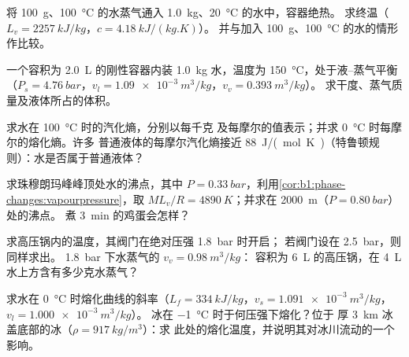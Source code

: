 \begin{exercise}[$\star$]\label{exo:b1:phase-changes:2}
将 \qty{100}{g}、\qty{100}{\degreeCelsius} 的水蒸气通入
\qty{1.0}{kg}、\qty{20}{\degreeCelsius} 的水中，容器绝热。
求终温（$L_v = \qty{2257}{kJ/kg}$，$c = \qty{4.18}{kJ/(kg.K)}$）。
并与加入 \qty{100}{g}、\qty{100}{\degreeCelsius} 的水的情形作比较。
\end{exercise}

\begin{exercise}[$\star$]\label{exo:b1:phase-changes:3}
一个容积为 \qty{2.0}{L} 的刚性容器内装 \qty{1.0}{kg} 水，温度为
\qty{150}{\degreeCelsius}，处于液–蒸气平衡（$P_s =
\qty{4.76}{bar}$，$v_l = \qty{1.09e-3}{m^3/kg}$，$v_v = \qty{0.393}{m^3/kg}$）。
求干度、蒸气质量及液体所占的体积。
\end{exercise}

\begin{exercise}[$\star$]\label{exo:b1:phase-changes:4}
求水在 \qty{100}{\degreeCelsius} 时的汽化熵，分别以每千克
及每摩尔的值表示；并求 \qty{0}{\degreeCelsius} 时每摩尔的熔化熵。许多
普通液体的每摩尔汽化熵接近
\qty{88}{J/(mol.K)}（特鲁顿规则）：水是否属于普通液体？
\end{exercise}

\begin{exercise}[$\star\star$]\label{exo:b1:phase-changes:5}
求珠穆朗玛峰峰顶处水的沸点，其中 $P =
\qty{0.33}{bar}$，利用\cref{cor:b1:phase-changes:vapourpressure}，取
$ML_v/R = \qty{4890}{K}$；并求在 \qty{2000}{m}（$P = \qty{0.80}{bar}$）处的沸点。
煮 \qty{3}{min} 的鸡蛋会怎样？
\end{exercise}

\begin{exercise}[$\star\star$]\label{exo:b1:phase-changes:6}
求高压锅内的温度，其阀门在绝对压强 \qty{1.8}{bar} 时开启；
若阀门设在 \qty{2.5}{bar}，则同样求出。
\qty{1.8}{bar} 下水蒸气的 $v_v = \qty{0.98}{m^3/kg}$：
容积为 \qty{6}{L} 的高压锅，在 \qty{4}{L} 水上方含有多少克水蒸气？
\end{exercise}

\begin{exercise}[$\star\star$]\label{exo:b1:phase-changes:7}
求水在 \qty{0}{\degreeCelsius} 时熔化曲线的斜率（$L_f =
\qty{334}{kJ/kg}$，$v_s = \qty{1.091e-3}{m^3/kg}$，$v_l = \qty{1.000e-3}{m^3/kg}$）。
冰在 \qty{-1}{\degreeCelsius} 时于何压强下熔化？位于
厚 \qty{3}{km} 冰盖底部的冰（$\rho = \qty{917}{kg/m^3}$）：求
此处的熔化温度，并说明其对冰川流动的一个影响。
\end{exercise}

